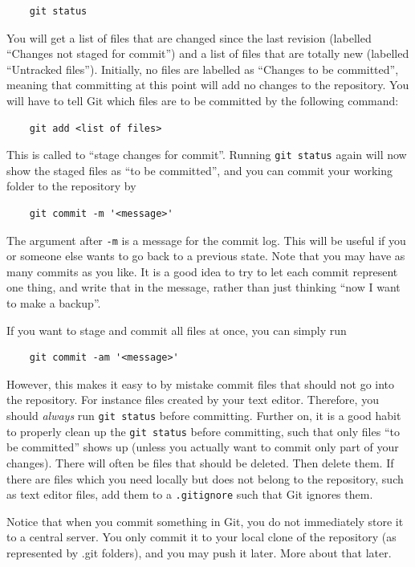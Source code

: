 \documentclass[10pt,a4paper]{article}
\begin{document}
\begin{verbatim}
	git status
\end{verbatim}
You will get a list of files that are changed since the last revision (labelled ``Changes not staged for commit'') and a list of files that are totally new (labelled ``Untracked files''). Initially, no files are labelled as ``Changes to be committed'', meaning that committing at this point will add no changes to the repository. You will have to tell Git which files are to be committed by the following command:

\begin{verbatim}
	git add <list of files>
\end{verbatim}
This is called to ``stage changes for commit''. Running \verb$git status$ again will now show the staged files as ``to be committed'', and you can commit your working folder to the repository by

\begin{verbatim}
	git commit -m '<message>'
\end{verbatim}
The argument after \verb$-m$ is a message for the commit log. This will be useful if you or someone else wants to go back to a previous state. Note that you may have as many commits as you like. It is a good idea to try to let each commit represent one thing, and write that in the message, rather than just thinking ``now I want to make a backup''.

If you want to stage and commit all files at once, you can simply run

\begin{verbatim}
	git commit -am '<message>'
\end{verbatim}
However, this makes it easy to by mistake commit files that should not go into the repository. For instance files created by your text editor. Therefore, you should \emph{always} run \verb$git status$ before committing. Further on, it is a good habit to properly clean up the \verb$git status$ before committing, such that only files ``to be committed'' shows up (unless you actually want to commit only part of your changes). There will often be files that should be deleted. Then delete them. If there are files which you need locally but does not belong to the repository, such as text editor files, add them to a \verb$.gitignore$ such that Git ignores them.

Notice that when you commit something in Git, you do not immediately store it to a central server. You only commit it to your local clone of the repository (as represented by .git folders), and you may push it later. More about that later.
\end{document}
